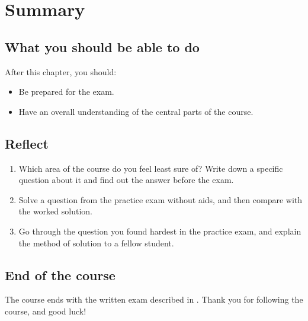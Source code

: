 
\section{Summary}
\label{c19:sec:sammanfattning}

\subsection*{What you should be able to do}
After this chapter, you should:
\begin{itemize}
  \item Be prepared for the exam.
  \item Have an overall understanding of the central parts of the course.
\end{itemize}

\subsection*{Reflect}
\begin{enumerate}
  \item Which area of the course do you feel least sure of? Write down a specific question about it
    and find out the answer before the exam.
  \item Solve a question from the practice exam without aids, and then compare with the worked
    solution.
  \item Go through the question you found hardest in the practice exam, and explain the method of
    solution to a fellow student.
\end{enumerate}

\subsection*{End of the course}
The course ends with the written exam described in . Thank you for
following the course, and good luck!
